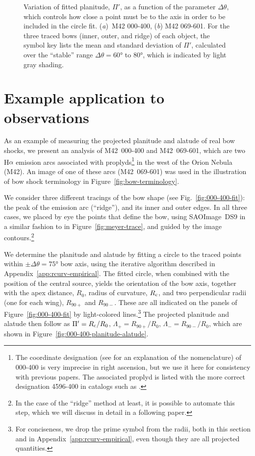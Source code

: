 \begin{figure}
\begin{tabular}{p{0.47\linewidth} p{0.47\linewidth}}
  \end{tabular}
  \caption[]{Variation of fitted planitude, \(\Pi'\), as a function of
    the parameter \(\Delta\theta\), which controls how close a point must be to
    the axis in order to be included in the circle
    fit. (\textit{a})~M42 000-400, (\textit{b}) M42 069-601.  For the
    three traced bows (inner, outer, and ridge) of each object, the
    symbol key lists the mean and standard deviation of \(\Pi'\),
    calculated over the ``stable'' range \(\Delta\theta = \ang{60}\) to
    \ang{80}, which is indicated by light gray shading.}
  \label{fig:000-400-Delta-theta}
\end{figure}

\section{Example application to observations}
\label{sec:obs}


As an example of measuring the projected planitude and alatude of real
bow shocks, we present an analysis of M42~000-400 and M42~069-601,
which are two H\(\alpha\) emission arcs \citep{Bally:2000a,
  Gutierrez-Soto:2015a} associated with proplyds\footnote{%
  The coordinate designation (see \citealp{ODell:1994a} for an
  explanation of the nomenclature) of 000-400 is very imprecise in
  right ascension, but we use it here for consistency with previous
  papers. The associated proplyd is listed with the more correct
  designation 4596-400 in catalogs such as \citet{Ricci:2008a}.  } %
in the west of the Orion Nebula (M42).  An image of one of these arcs
(M42~069-601) was used in the illustration of bow shock terminology in
Figure~\ref{fig:bow-terminology}.

We consider three different tracings of the bow shape (see
Fig.~\ref{fig:000-400-fit}): the peak of the emission arc (``ridge''),
and its inner and outer edges.  In all three cases, we placed by eye
the points that define the bow, using SAOImage~DS9 in a similar
fashion to in Figure~\ref{fig:meyer-trace}, and guided by the image
contours.\footnote{%
  In the case of the ``ridge'' method at least, it is possible to
  automate this step, which we will discuss in detail in a following
  paper. } %

We determine the planitude and alatude by fitting a circle to the
traced points within \(\pm \Delta\theta = \ang{75}\) bow axis, using the
iterative algorithm described in Appendix~\ref{app:rcurv-empirical}.
The fitted circle, when combined with the position of the central
source, yields the orientation of the bow axis, together with the apex
distance, \(R_0\), radius of curvature, \(R_{\mathrm{c}}\), and two
perpendicular radii (one for each wing), \(R_{90+}\) and \(R_{90-}\).
These are all indicated on the panels of Figure~\ref{fig:000-400-fit}
by light-colored lines.\footnote{%
  For conciseness, we drop the prime symbol from the radii, both in
  this section and in Appendix~\ref{app:rcurv-empirical}, even though
  they are all projected quantities.} %
The projected planitude and alatude then follow as \(\Pi' = R_{\mathrm{c}}/R_0\),
\(\Lambda_+ = R_{90+}/R_0\), \(\Lambda_- = R_{90-}/R_0\), which are shown in
Figure~\ref{fig:000-400-planitude-alatude}.

